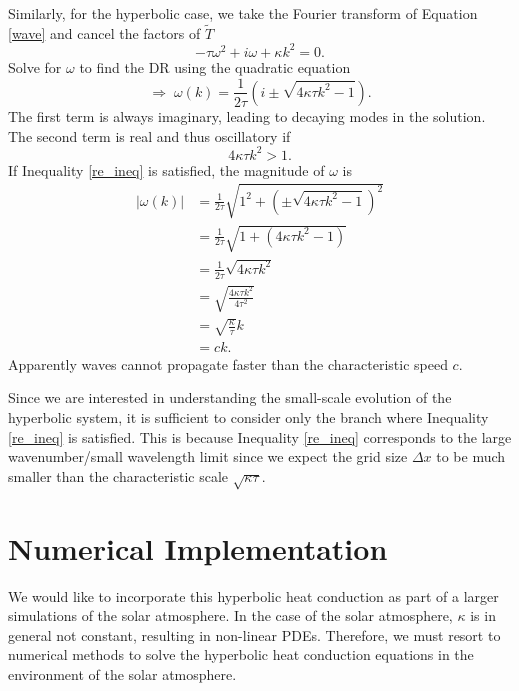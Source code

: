 \documentclass[iop]{emulateapj}
\begin{document}
			Similarly, for the hyperbolic case, we take the Fourier transform of Equation \ref{wave} and cancel the factors of $\tilde{T}$
			\begin{equation}
				- \tau \omega^2 + i \omega + \kappa k^2 = 0.
			\end{equation}
			Solve for $\omega$ to find the \ac{DR} using the quadratic equation
			\begin{equation}
				\Rightarrow \; \omega(k) = \frac{1}{2 \tau} \left( i \pm \sqrt{4 \kappa \tau k^2 - 1} \right).
			\end{equation}
			The first term is always imaginary, leading to decaying modes in the solution.
			The second term is real and thus oscillatory if 
			\begin{equation} \label{re_ineq}
			 4 \kappa \tau k^2 > 1.
			\end{equation}			
			If Inequality \ref{re_ineq} is satisfied, the magnitude of $\omega$ is
			\begin{align}
				|\omega(k)| &= \frac{1}{2 \tau} \sqrt{ 1^2 +  \left(\pm \sqrt{4 \kappa \tau k^2 - 1}\right)^2 } \\
							&= \frac{1}{2 \tau} \sqrt{1 + (4 \kappa \tau k^2 - 1)} \\
							&= \frac{1}{2 \tau} \sqrt{4 \kappa \tau k^2} \\
							&= \sqrt{\frac{4 \kappa \tau k^2}{4 \tau^2}} \\
							&= \sqrt{\frac{\kappa}{\tau}} k \\
							&= c k.
			\end{align}
			Apparently waves cannot propagate faster than the characteristic speed $c$.
			
			Since we are interested in understanding the small-scale evolution of the hyperbolic system, it is sufficient to consider only the branch where Inequality \ref{re_ineq} is satisfied.
			This is because Inequality \ref{re_ineq} corresponds to the large wavenumber/small wavelength limit since we expect the grid size $\Delta x$ to be much smaller than the characteristic scale $\sqrt{\kappa \tau}$.
			
			

		
	\section{Numerical Implementation}
	
		We would like to incorporate this hyperbolic heat conduction as part of a larger simulations of the solar atmosphere.
			In the case of the solar atmosphere, $\kappa$ is in general not constant, resulting in non-linear \acp{PDE}.
			Therefore, we must resort to numerical methods to solve the hyperbolic heat conduction equations in the environment of the solar atmosphere.
	
\end{document}

